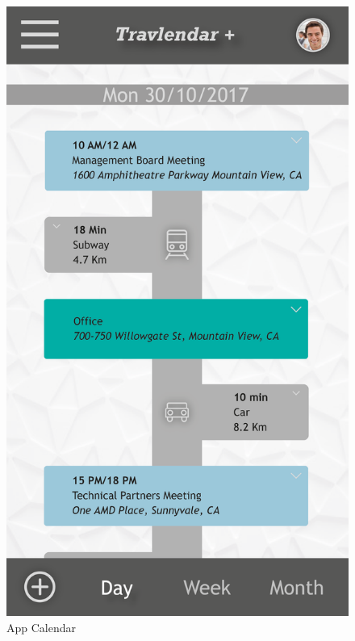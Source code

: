 \vspace*{-1cm}
\begin{figure}[!h]
	\centering
	\begin{minipage}{.275\textwidth}
		\centering
		\includegraphics[width=\linewidth]{Images/Mockups/MockupCalendarApp.png}
		\caption{App Calendar}
	\end{minipage}%
	\hspace*{1cm}
	\begin{minipage}{.65\textwidth}
		\centering

\end{minipage}
\end{figure}

